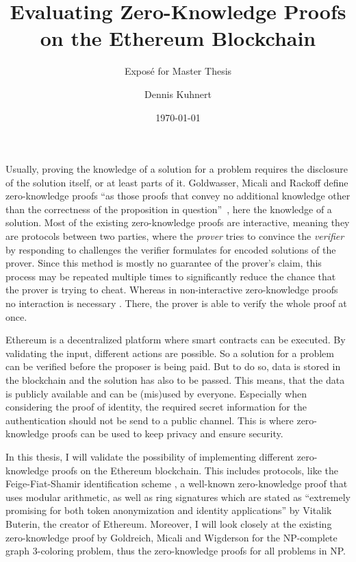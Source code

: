 \documentclass[a4paper,parskip=half]{scrartcl}
\title{Evaluating Zero-Knowledge Proofs on the Ethereum Blockchain\todo{determine title of thesis}}
\subtitle{Exposé for Master Thesis}
\author{Dennis Kuhnert}
\date{\today}
\begin{document}
\maketitle

Usually, proving the knowledge of a solution for a problem requires the disclosure of the solution itself, or at least parts of it.
Goldwasser, Micali and Rackoff define zero-knowledge proofs ``as those proofs that convey no additional knowledge other than the correctness of the proposition in question''~\cite{goldwasser1989knowledge}, here the knowledge of a solution.
Most of the existing zero-knowledge proofs are interactive, meaning they are protocols between two parties, where the \emph{prover} tries to convince the \emph{verifier} by responding to challenges the verifier formulates for encoded solutions of the prover.
Since this method is mostly no guarantee of the prover's claim, this process may be repeated multiple times to significantly reduce the chance that the prover is trying to cheat.
Whereas in non-interactive zero-knowledge proofs no interaction is necessary \cite{blum1988non}.
There, the prover is able to verify the whole proof at once.

Ethereum is a decentralized platform where smart contracts can be executed.
By validating the input, different actions are possible.
So a solution for a problem can be verified before the proposer is being paid.
But to do so, data is stored in the blockchain and the solution has also to be passed.
This means, that the data is publicly available and can be (mis)used by everyone.
Especially when considering the proof of identity, the required secret information for the authentication should not be send to a public channel.
This is where zero-knowledge proofs can be used to keep privacy and ensure security.

In this thesis, I will validate the possibility of implementing different zero-knowledge proofs on the Ethereum blockchain.
This includes protocols, like the Feige-Fiat-Shamir identification scheme \cite{feige1988zero}, a well-known zero-knowledge proof that uses modular arithmetic, as well as 
ring signatures which are stated as ``extremely promising for both token anonymization and identity applications'' \cite{buterin2015public} by Vitalik Buterin, the creator of Ethereum.
Moreover, I will look closely at the existing zero-knowledge proof by Goldreich, Micali and Wigderson \cite{goldreich1991proofs} for the NP-complete graph 3-coloring problem, thus the zero-knowledge proofs for all problems in NP.
\end{document}
